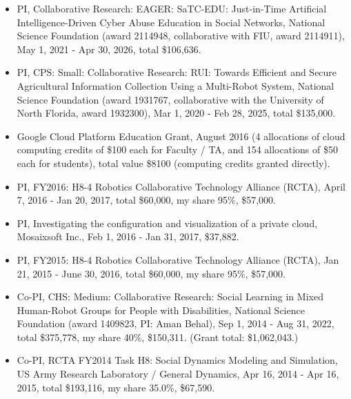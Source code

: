 \begin{itemize}[nosep, noitemsep]

    \item PI, Collaborative Research: EAGER: SaTC-EDU: Just-in-Time Artificial Intelligence-Driven Cyber Abuse Education in Social Networks, National Science Foundation (award 2114948, collaborative with FIU, award 2114911), May 1, 2021 - Apr 30, 2026, total \$106,636. \toconfirm

    \item PI, CPS: Small: Collaborative Research: RUI: Towards Efficient and Secure Agricultural Information Collection Using a Multi-Robot System, National Science Foundation (award 1931767, collaborative with the University of North Florida, award 1932300), Mar 1, 2020 - Feb 28, 2025, total \$135,000. \toconfirm


    \item Google Cloud Platform Education Grant, August 2016 (4 allocations of cloud computing credits of \$100 each for Faculty / TA, and 154 allocations of \$50 each for students), total value \$8100 (computing credits granted directly).

    \item PI, FY2016: H8-4 Robotics Collaborative Technology Alliance (RCTA), April 7, 2016 - Jan 20, 2017, total \$60,000, my share 95\%, \$57,000.

    \item PI, Investigating the configuration and visualization of a private cloud, Mosaixsoft Inc., Feb 1, 2016 - Jan 31, 2017, \$37,882.

    \item PI, FY2015: H8-4 Robotics Collaborative Technology Alliance (RCTA), Jan 21, 2015 - June 30, 2016, total \$60,000, my share 95\%, \$57,000.

    \item Co-PI, CHS: Medium: Collaborative Research: Social Learning in Mixed Human-Robot Groups for People with Disabilities, National Science Foundation (award 1409823, PI: Aman Behal), Sep 1, 2014 - Aug 31, 2022, total \$375,778, my share 40\%, \$150,311. (Grant total: \$1,062,043.) \toconfirm %

    \item Co-PI, RCTA FY2014 Task H8: Social Dynamics Modeling and Simulation, US Army Research Laboratory / General Dynamics, Apr 16, 2014 - Apr 16, 2015, total \$193,116, my share 35.0\%, \$67,590.


\end{itemize}
